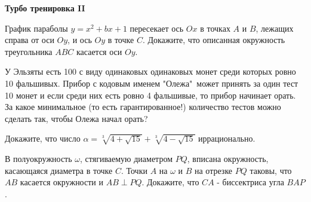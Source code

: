 \centerline{\bf \Huge Турбо тренировка II}
\centerline{\bf \Huge }

\begin{flushright}
        \scriptsize{}
\end{flushright}

График параболы $y=x^2+b x+1$ пересекает ось $O x$ в точках $A$ и $B$, лежащих справа от оси $O y$, и ось $O y$ в точке $C$. Докажите, что описанная окружность треугольника $A B C$ касается оси $O y$.

У Эльзяты есть 100 с виду одинаковых одинаковых монет среди которых ровно 10 фальшивых. Прибор с кодовым именем "Олежа"\ может принять за один тест 10 монет и если среди них есть ровно 4 фальшивые, то прибор начинает орать. За какое минимальное (то есть гарантированное!) количество тестов можно сделать так, чтобы Олежа начал орать?

Докажите, что число $\alpha=\sqrt[3]{4+\sqrt{15}}+\sqrt[3]{4-\sqrt{15}}$ иррационально.

В полуокружность $\omega$, стягиваемую диаметром $P Q$, вписана окружность, касающаяся диаметра в точке $C$. Точки $A$ на $\omega$ и $B$ на отрезке $P Q$ таковы, что $A B$ касается окружности и $A B \perp P Q$. Докажите, что $C A$ - биссектриса угла $B A P$.